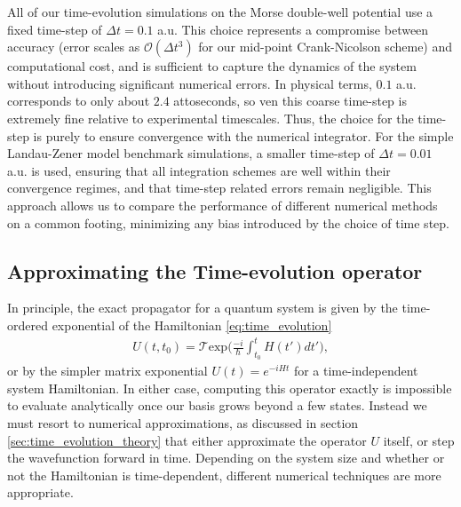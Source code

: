 \documentclass{subfiles}
\begin{document}
All of our time-evolution simulations on the Morse double-well potential use a fixed time-step of $\Delta t = 0.1$ a.u. This choice represents a compromise between accuracy (error scales as $\mathcal{O}(\Delta t^3)$ for our mid-point Crank-Nicolson scheme) and computational cost, and is sufficient to capture the dynamics of the system without introducing significant numerical errors. In physical terms, $0.1$ a.u. corresponds to only about $2.4$ attoseconds, so ven this coarse time-step is extremely fine relative to experimental timescales. Thus, the choice for the time-step is purely to ensure convergence with the numerical integrator. For the simple Landau-Zener model benchmark simulations, a smaller time-step of $\Delta t = 0.01$ a.u. is used, ensuring that all integration schemes are well within their convergence regimes, and that time-step related errors remain negligible. This approach allows us to compare the performance of different numerical methods on a common footing, minimizing any bias introduced by the choice of time step.

\subsection{Approximating the Time-evolution operator}\label{sec:time_evolution_operator}
In principle, the exact propagator for a quantum system is given by the time-ordered exponential of the Hamiltonian \eqref{eq:time_evolution}
\begin{align*}
    U(t, t_0) = \mathcal{T}\text{exp}\bigg(\frac{-i}{\hbar}\int_{t_0}^t H(t')dt'\bigg),
\end{align*}
or by the simpler matrix exponential $U(t) = e^{-iHt}$ for a time-independent system Hamiltonian. In either case, computing this operator exactly is impossible to evaluate analytically once our basis grows beyond a few states. Instead we must resort to numerical approximations, as discussed in section \ref{sec:time_evolution_theory} that either approximate the operator $U$ itself, or step the wavefunction forward in time. Depending on the system size and whether or not the Hamiltonian is time-dependent, different numerical techniques are more appropriate. 
\end{document}
